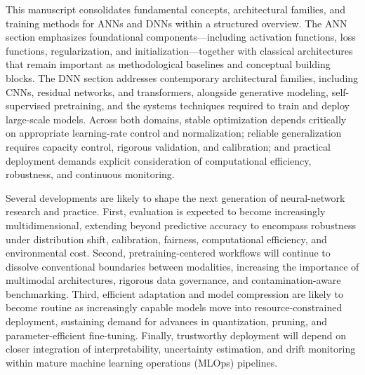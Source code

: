 \documentclass{article}
\begin{document}
This manuscript consolidates fundamental concepts, architectural families, and training methods for ANNs and DNNs within a structured overview. The ANN section emphasizes foundational components---including activation functions, loss functions, regularization, and initialization---together with classical architectures that remain important as methodological baselines and conceptual building blocks. The DNN section addresses contemporary architectural families, including CNNs, residual networks, and transformers, alongside generative modeling, self-supervised pretraining, and the systems techniques required to train and deploy large-scale models. Across both domains, stable optimization depends critically on appropriate learning-rate control and normalization; reliable generalization requires capacity control, rigorous validation, and calibration; and practical deployment demands explicit consideration of computational efficiency, robustness, and continuous monitoring.

Several developments are likely to shape the next generation of neural-network research and practice. First, evaluation is expected to become increasingly multidimensional, extending beyond predictive accuracy to encompass robustness under distribution shift, calibration, fairness, computational efficiency, and environmental cost. Second, pretraining-centered workflows will continue to dissolve conventional boundaries between modalities, increasing the importance of multimodal architectures, rigorous data governance, and contamination-aware benchmarking. Third, efficient adaptation and model compression are likely to become routine as increasingly capable models move into resource-constrained deployment, sustaining demand for advances in quantization, pruning, and parameter-efficient fine-tuning. Finally, trustworthy deployment will depend on closer integration of interpretability, uncertainty estimation, and drift monitoring within mature machine learning operations (MLOps) pipelines.




\clearpage






\end{document}
